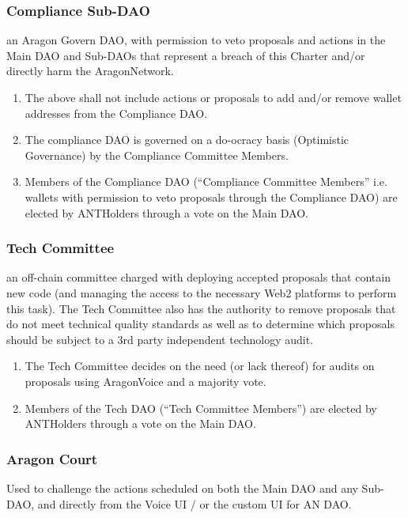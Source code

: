 \subsubsection*{Compliance Sub-\ac{DAO}}

an Aragon Govern \ac{DAO}, with permission to veto proposals and actions in the Main \ac{DAO} and Sub-\acp{DAO} that represent a breach of this Charter and/or directly harm the \gls{AragonNetwork}.
\begin{enumerate}
	\item The above shall not include actions or proposals to add and/or remove wallet addresses from the Compliance \ac{DAO}.
	\item The compliance \ac{DAO} is governed on a do-ocracy basis (Optimistic Governance) by the Compliance Committee Members.
	\item Members of the Compliance \ac{DAO} (``Compliance Committee Members'' i.e. wallets with permission to veto proposals through the Compliance \ac{DAO}) are elected by \glspl{ANTHolder} through a vote on the Main \ac{DAO}.
\end{enumerate}


\subsubsection*{Tech Committee}

an off-chain committee charged with deploying accepted proposals that contain new code (and managing the access to the necessary Web2 platforms to perform this task).
The Tech Committee also has the authority to remove proposals that do not meet technical quality standards as well as to determine which proposals should be subject to a 3rd party independent technology audit.
\begin{enumerate}
	\item The Tech Committee decides on the need (or lack thereof) for audits on proposals using \gls{AragonVoice} and a majority vote.
	\item Members of the Tech \ac{DAO} (``Tech Committee Members'') are elected by \glspl{ANTHolder} through a vote on the Main \ac{DAO}.
\end{enumerate}

\subsubsection{Aragon Court}
Used to challenge the actions scheduled on both the Main \ac{DAO} and any Sub-\ac{DAO}, and directly from the Voice UI / or the custom UI for AN \ac{DAO}.
	


